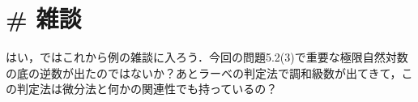 \documentclass{jarticle}
\begin{document}
\section*{\# 雑談}
はい，ではこれから例の雑談に入ろう．今回の問題5.2(3)で重要な極限自然対数の底の逆数が出たのではないか？あとラーベの判定法で調和級数が出てきて，この判定法は微分法と何かの関連性でも持っているの？
\end{document}

